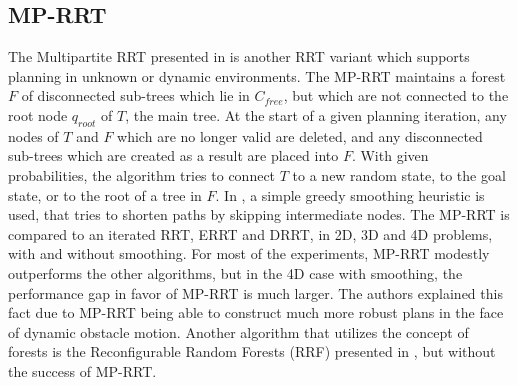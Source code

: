 \documentclass[10pt, conference, compsoc]{IEEEtran}
\begin{document}
\subsection{MP-RRT}\label{sec:MPRRT}
The Multipartite RRT presented in \cite{Zucker07} is another RRT variant which
supports planning in unknown or dynamic environments. The MP-RRT maintains a
forest $F$ of disconnected sub-trees which lie in $C_{free}$, but which are not
connected to the root node $q_{root}$ of $T$, the main tree. At the start of a
given planning iteration, any nodes of $T$ and $F$ which are no longer valid are
deleted, and any disconnected sub-trees which are created as a result are placed
into $F$.
With given probabilities,
the algorithm tries to connect $T$ to a
new random state, to the goal state, or to the root of a tree in $F$.
In \cite{Zucker07}, a simple greedy smoothing heuristic is used, that tries to
shorten paths by skipping intermediate nodes. The MP-RRT
is compared to an iterated RRT, ERRT and DRRT, in 2D, 3D and 4D problems, with
and without smoothing. For most of the experiments, MP-RRT modestly outperforms
the other algorithms, but in the 4D case with smoothing, the performance gap in
favor of MP-RRT is much larger. The authors explained this fact due to MP-RRT
being able to construct much more robust plans in the face of dynamic obstacle
motion. Another algorithm that utilizes the concept of forests is the
Reconfigurable Random Forests (RRF) presented in \cite{Li02}, but without the
success of MP-RRT.

\end{document}
